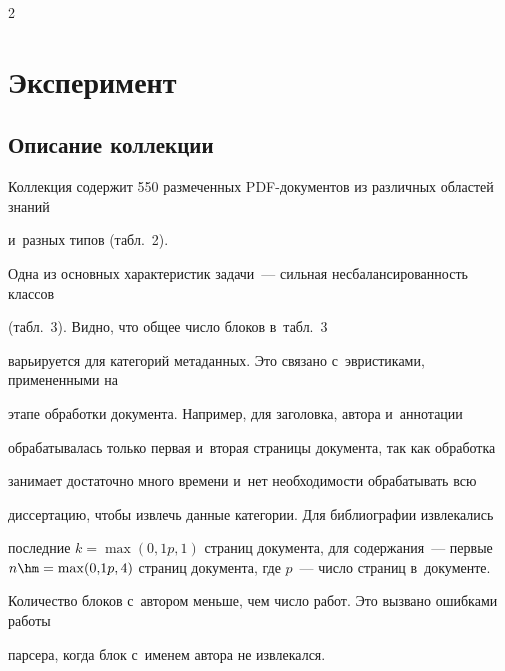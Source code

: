 \begin{multicols}{2}
\vspace*{-12pt}





\section{Эксперимент}





\subsection{Описание коллекции}





Коллекция содержит 550 размеченных PDF-до\-ку\-мен\-тов из различных областей знаний 


и~разных типов (табл.~2).








  


Одна из основных характеристик задачи~--- сильная несбалансированность классов 


(табл.~3). Видно, что общее чис\-ло блоков в~табл.~3 


варьируется для категорий метаданных. Это связано с~эвристиками, примененными на 


этапе обработки документа. Например, для заголовка, автора и~аннотации 


обрабатывалась только первая и~вторая страницы документа, так как обработка 


занимает достаточно много времени и~нет не\-об\-хо\-ди\-мости обрабатывать всю 


диссертацию, чтобы извлечь данные категории. Для библиографии извлекались 


последние $k = \max(0{,}1p, 1)$ стра\-ниц документа, для содержания~--- первые $n\hm = 


\max(0{,}1p, 4)$ стра\-ниц документа, где $p$~--- чис\-ло стра\-ниц в~документе. 


Количество блоков с~автором меньше, чем чис\-ло работ. Это вызвано ошибками работы 


пар\-се\-ра, когда блок с~именем автора не извлекался.








\end{multicols}
